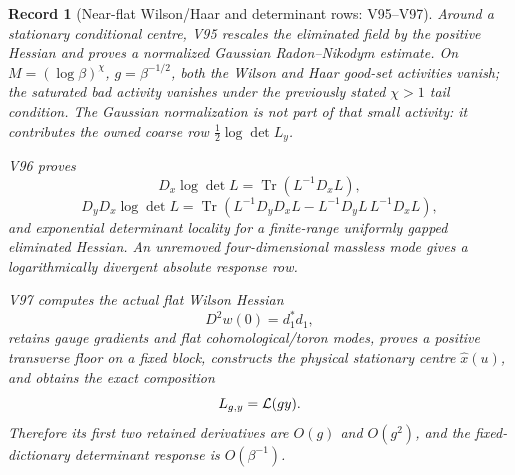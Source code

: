 \documentclass[11pt,oneside]{book}
\newtheorem{record}[theorem]{Record}
\theoremstyle{definition}
\theoremstyle{remark}
\newcommand{\Tr}{\operatorname{Tr}}
\begin{document}
\begin{record}[Near-flat Wilson/Haar and determinant rows: V95--V97]
\label{rec:e8v1-v95-v97}
Around a stationary conditional centre, V95 rescales the eliminated
field by the positive Hessian and proves a normalized Gaussian
Radon--Nikodym estimate.  On
\(M=(\log\beta)^\chi\), \(g=\beta^{-1/2}\), both the Wilson and Haar
good-set activities vanish; the saturated bad activity vanishes under
the previously stated \(\chi>1\) tail condition.  The Gaussian
normalization is not part of that small activity: it contributes the
owned coarse row \(\frac12\log\det L_y\).

V96 proves
\[
 D_x\log\det L=\Tr(L^{-1}D_xL),                      \label{eq:e8v1-logdet-first}
\]
\[
 D_yD_x\log\det L
 =
 \Tr\!\left(
 L^{-1}D_yD_xL-L^{-1}D_yL\,L^{-1}D_xL
 \right),                                            \label{eq:e8v1-logdet-second}
\]
and exponential determinant locality for a finite-range uniformly
gapped eliminated Hessian.  An unremoved four-dimensional massless
mode gives a logarithmically divergent absolute response row.

V97 computes the actual flat Wilson Hessian
\[
 D^2w(0)=d_1^*d_1,                                  \label{eq:e8v1-Wilson-Hessian}
\]
retains gauge gradients and flat cohomological/toron modes, proves a
positive transverse floor on a fixed block, constructs the physical
stationary centre \(\widehat x(u)\), and obtains the exact composition
\[
 L_{g,y}={\cal L}(gy).                               \label{eq:e8v1-Lgy}
\]
Therefore its first two retained derivatives are \(O(g)\) and
\(O(g^2)\), and the fixed-dictionary determinant response is
\(O(\beta^{-1})\).
\end{record}
\end{document}
